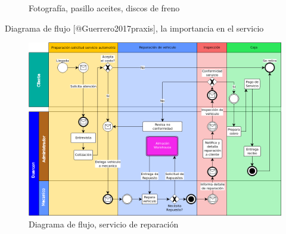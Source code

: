 \documentclass[a4papper,11pt]{article}
\begin{document}
      \begin{figure}
       \centering
       \caption{Fotografía, pasillo aceites, discos de freno}
       \label{almacen1_front}
      \end{figure}
    
    Diagrama de flujo [@Guerrero2017praxis], la importancia en el servicio
    
      \begin{figure}[!ht]
        \centering
        \includegraphics[width=\textwidth]{df_grl.png}
        \caption{Diagrama de flujo, servicio de reparación}
        \label{Dfl_serv}
        \end{figure}
\end{document}
